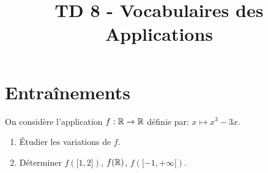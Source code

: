 \documentclass[a4paper, 11pt,reqno]{article}
\newcommand{\type}{TD }
\begin{document}
\title{\type 8 - Vocabulaires des Applications}

\section*{Entraînements}

\begin{exercice}  \;
	On consid\`ere l'application $f:\mathbb{R}\rightarrow\mathbb{R}$ d\'efinie par: $x  \mapsto  x^3-3x.$
	\begin{enumerate}
		\item
		      \'Etudier les variations de $f$.
		\item
		      D\'eterminer $f(\lbrack 1,2\rbrack)$, $f(\mathbb{R})$, $f(\lbrack -1,+\infty\lbrack)$.
	\end{enumerate}
\end{exercice}
\end{document}
